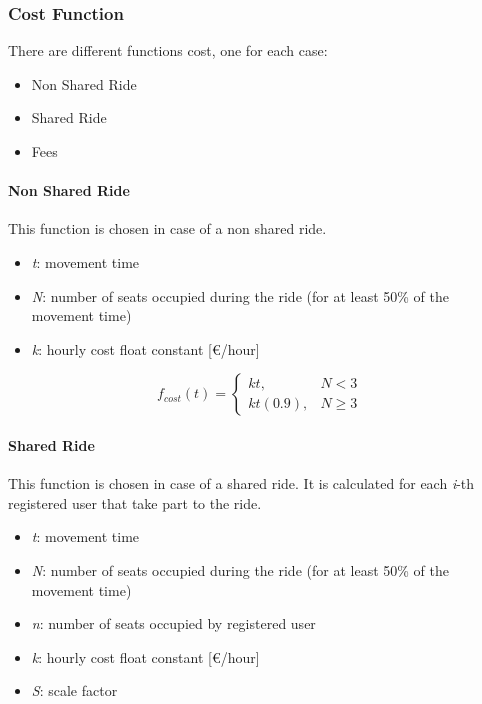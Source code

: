 \documentclass{article}
\begin{document}
			\subsubsection{Cost Function}
			There are different functions cost, one for each case:
			\begin{itemize}
				\item Non Shared Ride
				\item Shared Ride
				\item Fees
			\end{itemize}
			
			\paragraph{Non Shared Ride}
			This function is chosen in case of a non shared ride.
				\begin{itemize}
					\item \textit{t}: movement time
					\item \textit{N}: number of seats occupied during the ride (for at least 50\% of the movement time)
					\item \textit{k}: hourly cost float constant [\euro/hour]
				\end{itemize}
				\begin{equation}
					f_{cost}(t)= 
					\begin{cases}
					{kt},& N < 3\\
					{kt(0.9)},& N \geq 3
					\end{cases}
				\end{equation}
			
			\paragraph{Shared Ride}
			This function is chosen in case of a shared ride. It is calculated for each \textit{i}-th registered user that take part to the ride.
				\begin{itemize}
					\item \textit{t}: movement time
					\item \textit{N}: number of seats occupied during the ride (for at least 50\% of the movement time)
					\item \textit{n}: number of seats occupied by registered user
					\item \textit{k}: hourly cost float constant [\euro/hour]
					\item \textit{S}: scale factor
				\end{itemize}
				
\end{document}
